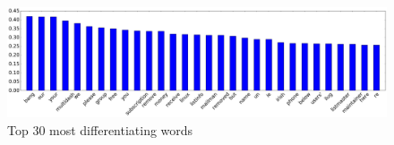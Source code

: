 \documentclass[12pt, a4paper]{article}
\begin{document}
  \vspace{0.5cm}
  \begin{figure}[H]
    \caption{Top 30 most differentiating words}
    \label{wordprobsham}
    \vspace{-0.2cm}
    \centering
    \includegraphics[width=1\linewidth]{report_images/word_probs_diff}
  \end{figure}
\end{document}
